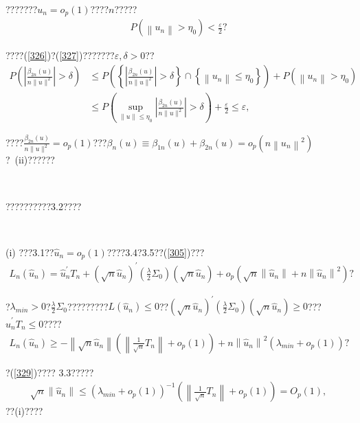 \documentclass[a4paper,12pt,openany,oneside,utf-8]{ctexbook}
\newcommand{\xiaosihao}{\fontsize{12pt}{\baselineskip}\selectfont}
\begin{document}
	\noindent ???????$u_n=o_p(1)$????$n$?????
	\begin{align}\label{327}
		P\left(\left\|u_{n}\right\|>\eta_{0}\right)< \frac{\varepsilon}{2}\mbox{?}
	\end{align}
	
	\noindent ????(\ref{326})?(\ref{327})???????$\varepsilon,\delta>0$??
	\begin{align}
		P\left(\left|\frac{\beta_{2 n}(u)}{n\|u\|^2}\right|>\delta\right) &\leq P\left(\left\{\left|\frac{\beta_{2 n}(u)}{n\|u\|^2}\right|>\delta\right\} \cap\left\{\left\|u_{n}\right\| \le \eta_{0}\right\}\right)+P\left(\left\|u_{n}\right\|>\eta_{0}\right)\nonumber\\
		&\leq P\left(\sup _{\|u\| \leq \eta_{0}}\left|\frac{\beta_{2 n}(u)}{n\|u\|^2}\right|>\delta\right)+\frac{\varepsilon}{2}\le \varepsilon,\nonumber
	\end{align}
	
	\noindent ????$\frac{\beta_{2 n}(u)}{n\|u\|^2}=o_p(1)$???$\beta_{n}(u) \equiv \beta_{1 n}(u)+\beta_{2 n}(u)=o_p\left(n\left\|u_{n}\right\|^{2}\right)$?~(ii)??????
	
	\
	
	??????????3.2????
	
	\noindent{\xiaosihao\heiti ??~3.2??}~~
	
	\noindent(i) ???3.1??$\hat{u}_n=o_p(1)$????3.4?3.5??(\ref{305})???
	\begin{align}\label{328}
		L_{n}\left(\hat{u}_{n}\right)=\hat{u}_{n}^{\prime} T_{n}+\left(\sqrt{n} \hat{u}_{n}\right)^{\prime}\left(\frac{\lambda}{2} \Sigma_{0}\right)\left(\sqrt{n} \hat{u}_{n}\right)+o_{p}\left(\sqrt{n}\left\|\hat{u}_{n}\right\|+n\left\|\hat{u}_{n}\right\|^{2}\right)\mbox{?}
	\end{align}
	
	\noindent ?$\lambda_{min}>0$?$\frac{\lambda}{2}\Sigma_0$?????????$L(\hat{u}_n)\le0$??$\left(\sqrt{n}\hat{u}_{n}\right)^{\prime}\left(\frac{\lambda}{2} \Sigma_{0}\right)\left(\sqrt{n} \hat{u}_{n}\right)\ge 0$???~$\hat{u}_{n}^{\prime} T_{n}\le0$????
	\begin{align}\label{329}
		L_{n}\left(\hat{u}_{n}\right) \geq-\left\|\sqrt{n} \hat{u}_{n}\right\|\left(\left\|\frac{1}{\sqrt{n}} T_{n}\right\|+o_{p}(1)\right)+n\left\|\hat{u}_{n}\right\|^{2}\left(\lambda_{min }+o_{p}(1)\right)\mbox{?}
	\end{align}
	
	\noindent ?(\ref{329})???? 3.3?????
	\begin{align}\label{330}
		\sqrt{n}\left\|\hat{u}_{n}\right\| \leq\left(\lambda_{min }+o_{p}(1)\right)^{-1}\left(\left\|\frac{1}{\sqrt{n}} T_{n}\right\|+o_{p}(1)\right)=O_{p}(1),
	\end{align}
	??(i)????
	
\end{document}
